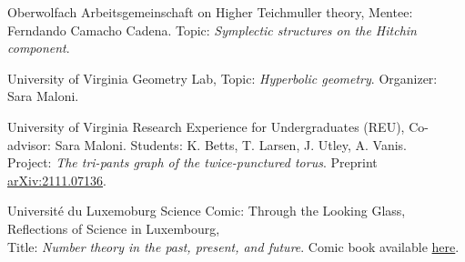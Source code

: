 
{Oberwolfach}
{Arbeitsgemeinschaft on Higher Teichmuller theory,}
{Mentee: Ferndando Camacho Cadena. Topic: \emph{Symplectic structures on the Hitchin component}.}

{University of Virginia}
{Geometry Lab,}
{Topic: \emph{Hyperbolic geometry}. Organizer: Sara Maloni.}

{University of Virginia}
{Research Experience for Undergraduates (REU),}
{Co-advisor: Sara Maloni. Students: K. Betts, T. Larsen, J. Utley, A. Vanis. \\Project: \emph{The tri-pants graph of the twice-punctured torus}. Preprint \href{https://arxiv.org/abs/2111.07136}{arXiv:2111.07136}.}

{Universit{\'e} du Luxemoburg}
{Science Comic: Through the Looking Glass, Reflections of Science}
{\vspace{-0.3em}
{\normalsize in Luxembourg,} \\
Title: \emph{Number theory in the past, present, and future}. Comic book available \href{https://www.yumpu.com/en/document/view/62710549/science-comic-through-the-looking-glass-reflections-of-science-in-luxembourg}{here}.}

